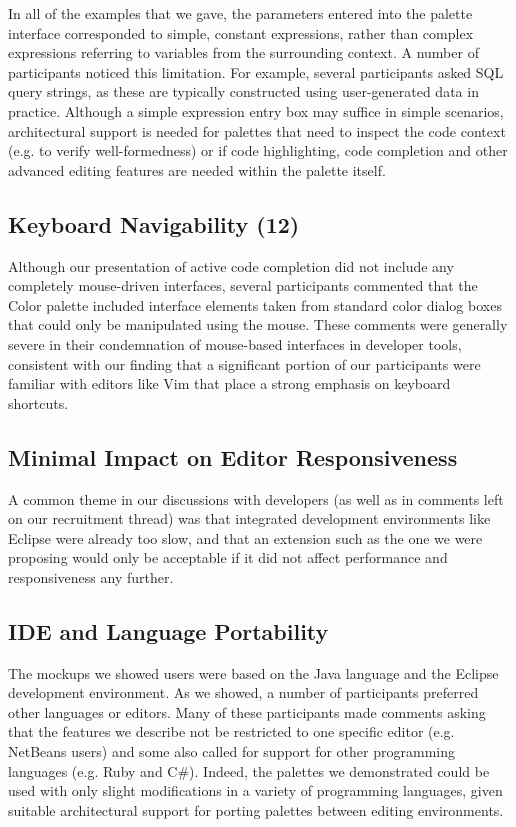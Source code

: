 \documentclass[10pt, conference, compsocconf]{IEEEtran}
\begin{document}
In all of the examples that we gave, the parameters entered into the palette interface corresponded to simple, constant expressions, rather than complex expressions referring to variables from the surrounding context. A number of participants noticed this limitation. For example, several participants asked SQL query strings, as these are typically constructed using user-generated data in practice. Although a simple expression entry box may suffice in simple scenarios, architectural support is needed for palettes that need to inspect the code context (e.g. to verify well-formedness) or if code highlighting, code completion and other advanced editing features are needed within the palette itself.

\subsection{Keyboard Navigability (12)}

Although our presentation of active code completion did not include any completely mouse-driven interfaces, several participants commented that the Color palette included interface elements taken from standard color dialog boxes that could only be manipulated using the mouse. These comments were generally severe in their condemnation of mouse-based interfaces in developer tools, consistent with our finding that a significant portion of our participants were familiar with editors like Vim that place a strong emphasis on keyboard shortcuts.

\subsection{Minimal Impact on Editor Responsiveness}

A common theme in our discussions with developers (as well as in comments left on our recruitment thread) was that integrated development environments like Eclipse were already too slow, and that an extension such as the one we were proposing would only be acceptable if it did not affect performance and responsiveness any further.

\subsection{IDE and Language Portability}

The mockups we showed users were based on the Java language and the Eclipse development environment. As we showed, a number of participants preferred other languages or editors. Many of these participants made comments asking that the features we describe not be restricted to one specific editor (e.g. NetBeans users) and some also called for support for other programming languages (e.g. Ruby and C\#). Indeed, the palettes we demonstrated could be used with only slight modifications in a variety of programming languages, given suitable architectural support for porting palettes between editing environments.
\end{document}

